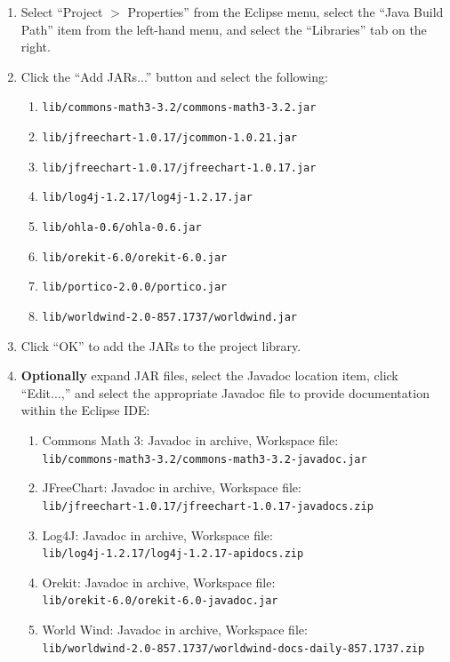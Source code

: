 \documentclass[]{article}
\begin{document}
\begin{enumerate}
\begin{enumerate}
\item Select ``Project $>$ Properties'' from the Eclipse menu, select the ``Java Build Path'' item from the left-hand menu, and select the ``Libraries'' tab on the right.
\item Click the ``Add JARs...'' button and select the following:
\begin{enumerate}
\item \texttt{lib/commons-math3-3.2/commons-math3-3.2.jar}
\item \texttt{lib/jfreechart-1.0.17/jcommon-1.0.21.jar}
\item \texttt{lib/jfreechart-1.0.17/jfreechart-1.0.17.jar}
\item \texttt{lib/log4j-1.2.17/log4j-1.2.17.jar}
\item \texttt{lib/ohla-0.6/ohla-0.6.jar}
\item \texttt{lib/orekit-6.0/orekit-6.0.jar}
\item \texttt{lib/portico-2.0.0/portico.jar}
\item \texttt{lib/worldwind-2.0-857.1737/worldwind.jar}
\end{enumerate}
\item Click ``OK'' to add the JARs to the project library.
\item \textbf{Optionally} expand JAR files, select the Javadoc location item, click ``Edit...,'' and select the appropriate Javadoc file to provide documentation within the Eclipse IDE:
\begin{enumerate}
\item Commons Math 3: Javadoc in archive, Workspace file: \\ \texttt{lib/commons-math3-3.2/commons-math3-3.2-javadoc.jar}
\item JFreeChart: Javadoc in archive, Workspace file: \\ \texttt{lib/jfreechart-1.0.17/jfreechart-1.0.17-javadocs.zip}
\item Log4J: Javadoc in archive, Workspace file: \\ \texttt{lib/log4j-1.2.17/log4j-1.2.17-apidocs.zip}
\item Orekit: Javadoc in archive, Workspace file: \\ \texttt{lib/orekit-6.0/orekit-6.0-javadoc.jar}
\item World Wind: Javadoc in archive, Workspace file: \\ \texttt{lib/worldwind-2.0-857.1737/worldwind-docs-daily-857.1737.zip}
\end{enumerate}

\end{enumerate}
\end{enumerate}
\end{document}
